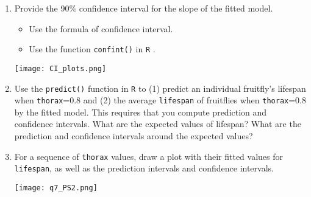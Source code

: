 \documentclass[12pt,letterpaper]{article}
\begin{document}
\begin{enumerate}
		\newpage
		\item
		
		Provide the 90\% confidence interval for the slope of the fitted model.
		
		\vspace{.5cm}
		\begin{itemize}
			\item
			Use the formula of confidence interval.		\vspace{.5cm}
			\item
			Use the function  \texttt{confint()}  in \texttt{R} .
		\end{itemize}
		\vspace{1cm}
		
		\vspace{1cm}
		\texttt{[image: CI\_plots.png]}
		\vspace{6cm}
		\item Use the \texttt{predict()} function in \texttt{R} to (1) predict an individual fruitfly's lifespan when \texttt{thorax}=0.8 and (2) the average \texttt{lifespan} of fruitflies when \texttt{thorax}=0.8 by the fitted model. This requires that you compute prediction and confidence intervals. What are the expected values of lifespan? What are the prediction and confidence intervals around the expected values? 
		\vspace{1cm}
		
		
		\vspace{6cm}
		\item	For a sequence of \texttt{thorax} values, draw a plot with their fitted values for \texttt{lifespan}, as well as the prediction intervals and confidence intervals.
		\vspace{1cm}
		
		\vspace{1cm}
		\texttt{[image: q7\_PS2.png]}
		
		
		
	\end{enumerate}
\end{document}
